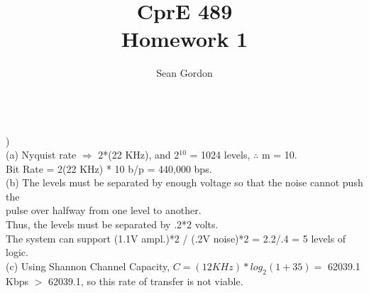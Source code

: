 \documentclass[12pt]{article}
\title{CprE 489\\Homework 1}
\author{Sean Gordon}
\begin{document}
\maketitle


\hrulefill \\


)\\
\indent (a) Nyquist rate $\Rightarrow$ 2*(22 KHz), and 2$^{10}$ = 1024 levels, $\therefore$ m = 10. \\
\indent \indent Bit Rate = 2(22 KHz) * 10 b/p = 440,000 bps.\\

(b) The levels must be separated by enough voltage so that the noise cannot push the \\
\indent \indent pulse over halfway from one level to another.\\
\indent \indent Thus, the levels must be separated by .2*2 volts.\\

\indent \indent The system can support (1.1V ampl.)*2 / (.2V noise)*2 = 2.2/.4 = 5 levels of logic.\\

\indent (c) Using Shannon Channel Capacity, $C = (12 KHz)*log_2(1+35) = $ 62039.1\\
\indent {} Kbps $>$ 62039.1, so this rate of transfer is not viable.

\hrulefill \\
\end{document}
